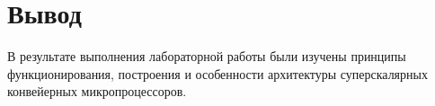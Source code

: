 \section{Вывод}

В результате выполнения лабораторной работы были изучены принципы функционирования, построения и особенности архитектуры суперскалярных конвейерных микропроцессоров.
